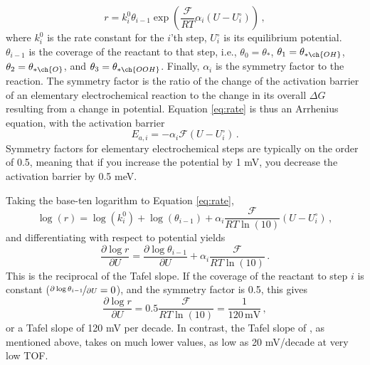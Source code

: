 \begin{equation}
r = k^0_i\theta_{i-1}\exp\left(\frac{\mathcal{F}}{RT}\alpha_i(U-U^\circ_i)\right)\,,\label{eq:rate}
\end{equation}
where $k^0_i$ is the rate constant for the $i$'th step, $U^\circ_i$ is its equilibrium potential. $\theta_{i-1}$ is the coverage of the reactant to that step, i.e., $\theta_0 = \theta_{*}$, $\theta_1 = \theta_{* \ch{OH}}$, $\theta_2 = \theta_{* \ch{O}}$, and $\theta_3 = \theta_{* \ch{OOH}}$. Finally, $\alpha_i$ is the symmetry factor to the reaction. The symmetry factor is the ratio of the change of the activation barrier of an elementary electrochemical reaction to the change in its overall $\Delta G$ resulting from a change in potential\cite{Bard2001}. Equation \ref{eq:rate} is thus an Arrhenius equation, with the activation barrier
\begin{equation}
E_{a,i} = - \alpha_i\mathcal{F}(U - U^\circ_i)\,.
\end{equation}
Symmetry factors for elementary electrochemical steps are typically on the order of 0.5, meaning that if you increase the potential by 1 mV, you decrease the activation barrier by 0.5 meV.

Taking the base-ten logarithm to Equation \ref{eq:rate}, 
\begin{equation}
\log(r) = \log(k^0_i) + \log(\theta_{i-1}) + \alpha_i\frac{\mathcal{F}}{RT\ln(10)}(U-U^\circ_i)\,,
\end{equation}
and differentiating with respect to potential yields
\begin{equation}
\frac{\partial \log{r}}{\partial U} = \frac{\partial \log{\theta_{i-1}}}{\partial U} + \alpha_i\frac{\mathcal{F}}{RT\ln(10)}\,.
\end{equation}
This is the reciprocal of the Tafel slope. If the coverage of the reactant to step $i$ is constant ($\nicefrac{\partial \log{\theta_{i-1}}}{\partial U} = 0$), and the symmetry factor is 0.5, this gives 
\begin{equation}
\frac{\partial \log{r}}{\partial U} = 0.5\frac{\mathcal{F}}{RT\ln(10)} = \frac{1}{120\,\text{mV}}\,,
\end{equation}
or a Tafel slope of 120 mV per decade. In contrast, the Tafel slope of , as mentioned above, takes on much lower values, as low as 20 mV/decade at very low TOF.

